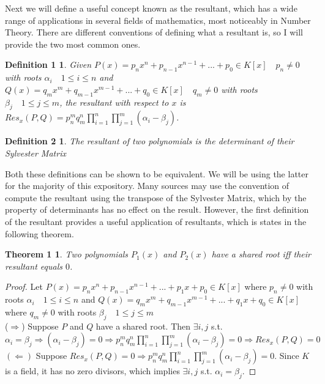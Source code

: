 \documentclass{article}
\newtheorem*{Definition: Sylvester Matrix}{Definition}
\newtheorem*{Definition: Resultant 1}{Definition 1}
\newtheorem*{Definition: Resultant 2}{Definition 2}
\newtheorem*{Theorem: Resultant proves shared roots}{Theorem 1}
\newtheorem*{Theorem: Minimal polynomial for beta}{Theorem 2}
\newtheorem*{Example: Sylvester Matrix Ex}{Example}
\newtheorem*{Theorem: Roots}{Theorem}
\newtheorem*{Corollary: Discriminant}{Corollary}
\newtheorem*{Theorem: Rational Root Theorem}{Theorem}
\newtheorem*{Corollary: Cubic Irreducibility}{Corollary}
\newtheorem*{Theorem: Eisenstein Criterion}{Theorem}
\newtheorem*{Theorem: mod p Test}{Theorem}
\newtheorem*{Theorem: Rabin's algorithm}{Theorem}
\newtheorem*{Theorem: gcd finite field}{Theorem}
\newtheorem*{Theorem: Gauss Irreducibles}{Theorem}
\newtheorem*{Theorem: Number of irreducibles}{Theorem}
\newtheorem*{Example: All irreducibles in Z_2}{Example}
\newtheorem*{Formula: Minimal polynomial for r root of a}{Formula 1}
\newtheorem*{Example: minimal polynomial for sqrt(p)}{Example}
\newtheorem*{Example: Golden Ratio}{Example}
\newtheorem*{Formula: Minimal polynomial for a+b}{Formula 2}
\newtheorem*{Example: 1 + sqrt(3)}{Example}
\newtheorem*{Example: cubic root of unity}{Example}
\newtheorem*{Formula: Minimal polynomial for a/b}{Formula 3}
\newtheorem*{Formula: Minimal polynomial for ab}{Formula 4}
\newtheorem*{Example: cubrt(4)/i+1}{Example}
\newtheorem*{Example: 5zeta}{Example}
\newtheorem*{Example: Wild one}{Example}
\begin{document}
Next we will define a useful concept known as the resultant, which has a wide range of applications in several fields of mathematics, most noticeably in Number Theory. There are different conventions of defining what a resultant is, so I will provide the two most common ones. 

\begin{Definition: Resultant 1}
Given $P(x) = p_nx^n + p_{n-1}x^{n-1} + ... + p_0 \in K[x] \quad p_n \neq 0$ with roots $\alpha_i  \quad 1 \leq i \leq n$ and $Q(x) = q_mx^m+q_{m-1}x^{m-1}+...+q_0 \in K[x] \quad q_m \neq 0$ with roots $\beta_j  \quad 1 \leq  j \leq m$, the resultant with respect to $x$ is $Res_x(P, Q) = p_n^mq_m^n \displaystyle \prod_{i=1}^{n} \displaystyle \prod_{j=1}^{m}(\alpha_i-\beta_j)$. 
\end{Definition: Resultant 1}

\begin{Definition: Resultant 2}
The resultant of two polynomials is the determinant of their Sylvester Matrix
\end{Definition: Resultant 2}

Both these definitions can be shown to be equivalent. We will be using the latter for the majority of this expository. Many sources may use the convention of compute the resultant using the transpose of the Sylvester Matrix, which by the property of determinants has no effect on the result. However, the first definition of the resultant provides a useful application of resultants, which is states in the following theorem.

\begin{Theorem: Resultant proves shared roots}
Two polynomials $P_1(x)$ and $P_2(x)$ have a shared root iff their resultant equals $0$.
\end{Theorem: Resultant proves shared roots}

\begin{proof}
Let $P(x) = p_n x^n + p_{n-1}x^{n-1}+...+p_1x + p_0 \in K[x]$ where $p_n \neq 0$ with roots $\alpha_i  \quad 1 \leq i \leq n$  and $Q(x) = q_m x^m + q_{m-1}x^{m-1}+...+q_1 x + q_0 \in K[x]$ where $q_m \neq 0$ with roots $\beta_j \quad 1 \leq j \leq m$ \\
($\Rightarrow$) Suppose $P$ and $Q$ have a shared root. Then $\exists i, j$ s.t. $\alpha_i=\beta_j \Rightarrow (\alpha_i-\beta_j) = 0 \Rightarrow p_n^mq_m^n \displaystyle \prod_{i=1}^{n} \displaystyle \prod_{j=1}^{m}(\alpha_i-\beta_j) = 0 \Rightarrow Res_x(P, Q) = 0$\\
$(\Leftarrow)$ Suppose $Res_x(P,Q) = 0 \Rightarrow p_n^mq_m^n \displaystyle \prod_{i=1}^{n} \displaystyle \prod_{j=1}^{m}(\alpha_i-\beta_j) = 0$. Since $K$ is a field, it has no zero divisors, which implies $\exists i,j$ s.t. $\alpha_i = \beta_j$. 
\end{proof}
\end{document}
